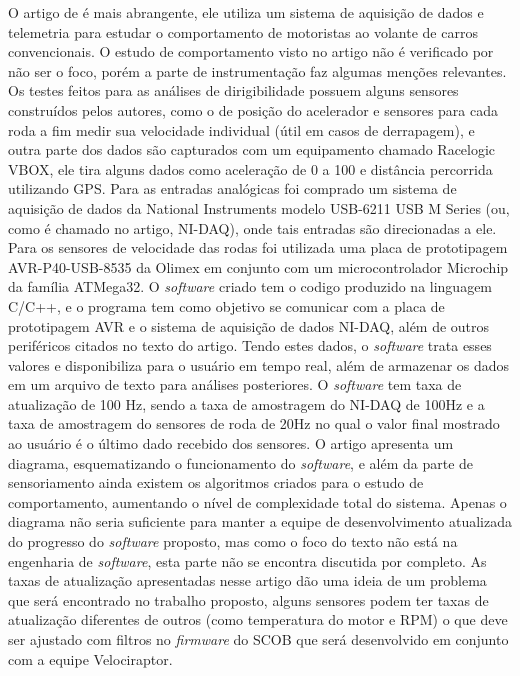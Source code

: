 O artigo de  é mais abrangente, ele utiliza um sistema de aquisição de dados e telemetria para estudar o comportamento de motoristas ao volante de carros convencionais. O estudo de comportamento visto no artigo não é verificado por não ser o foco, porém a parte de instrumentação faz algumas menções relevantes. Os testes feitos para as análises de dirigibilidade possuem alguns sensores construídos pelos autores, como o de posição do acelerador e sensores para cada roda a fim medir sua velocidade individual (útil em casos de derrapagem), e outra parte dos dados são capturados com um equipamento chamado Racelogic VBOX, ele tira alguns dados como aceleração de 0 a 100 e distância percorrida utilizando GPS. Para as entradas analógicas foi comprado um sistema de aquisição de dados da National Instruments modelo USB-6211 USB M Series (ou, como é chamado no artigo, NI-DAQ), onde tais entradas são direcionadas a ele. Para os sensores de velocidade das rodas foi utilizada uma placa de prototipagem AVR-P40-USB-8535 da Olimex em conjunto com um microcontrolador Microchip da família ATMega32. O \textit{software} criado tem o codigo produzido na linguagem C/C++, e o programa tem como objetivo se comunicar com a placa de prototipagem AVR e o sistema de aquisição de dados NI-DAQ, além de outros periféricos citados no texto do artigo. Tendo estes dados, o \textit{software} trata esses valores e disponibiliza para o usuário em tempo real, além de armazenar os dados em um arquivo de texto para análises posteriores. O \textit{software} tem taxa de atualização de 100 Hz, sendo a taxa de amostragem do NI-DAQ de 100Hz e a taxa de amostragem do sensores de roda de 20Hz no qual o valor final mostrado ao usuário é o último dado recebido dos sensores. O artigo apresenta um diagrama, esquematizando o funcionamento do \textit{software}, e além da parte de sensoriamento ainda existem os algoritmos criados para o estudo de comportamento, aumentando o nível de complexidade total do sistema. Apenas o diagrama não seria suficiente para manter a equipe de desenvolvimento atualizada do progresso do \textit{software} proposto, mas como o foco do texto não está na engenharia de \textit{software}, esta parte não se encontra discutida por completo. As taxas de atualização apresentadas nesse artigo dão uma ideia de um problema que será encontrado no trabalho proposto, alguns sensores podem ter taxas de atualização diferentes de outros (como temperatura do motor e RPM) o que deve ser ajustado com filtros no \textit{firmware} do SCOB que será desenvolvido em conjunto com a equipe Velociraptor.


